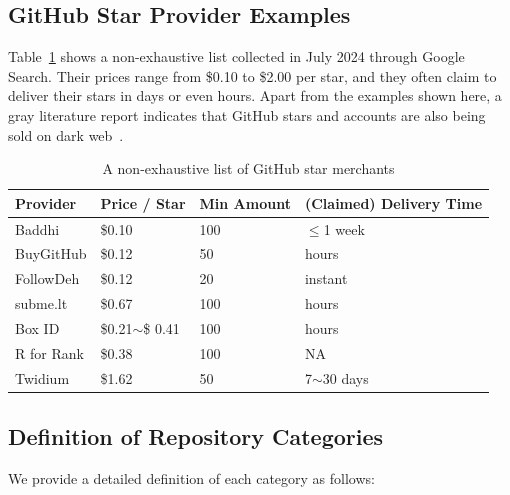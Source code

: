 \subsection{GitHub Star Provider Examples}
\label{sec:fake-stars-appendix-providers}

Table~\ref{tab:fake-star-providers} shows a non-exhaustive list collected in July 2024 through Google Search.
Their prices range from \$0.10 to \$2.00 per star, and they often claim to deliver their stars in days or even hours.
Apart from the examples shown here, a gray literature report indicates that GitHub stars and accounts are also being sold on dark web~\cite{stargazer-goblin}.

\begin{table}[t]
    \small
    \centering
    \caption{A non-exhaustive list of GitHub star merchants}
    \begin{tabular}{llll}
    \toprule
    Provider & Price / Star & Min Amount & (Claimed) Delivery Time \\ 
    \midrule
    Baddhi   & \$0.10 & 100 & $\le$1 week\\
    BuyGitHub  & \$0.12 & 50 & hours \\
    FollowDeh  & \$0.12 & 20 & instant \\ 
    subme.lt & \$0.67 & 100 & hours \\
    Box ID & \$0.21$\sim$\$ 0.41 & 100 & hours \\ 
    R for Rank& \$0.38 & 100 & NA\\ 
    Twidium & \$1.62 & 50 & 7$\sim$30 days\\
    \bottomrule
    \end{tabular}
    \label{tab:fake-star-providers}
\end{table}

\subsection{Definition of Repository Categories}

We provide a detailed definition of each category as follows:

